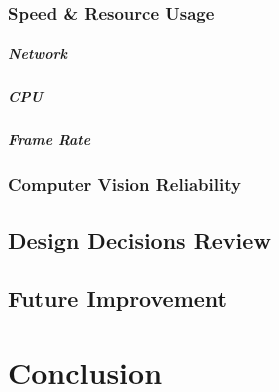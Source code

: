 \subsection{Speed \& Resource Usage}



\paragraph{Network}



\paragraph{CPU}



\paragraph{Frame Rate}



\subsection{Computer Vision Reliability}



\section{Design Decisions Review}



\section{Future Improvement}




\chapter{Conclusion}



